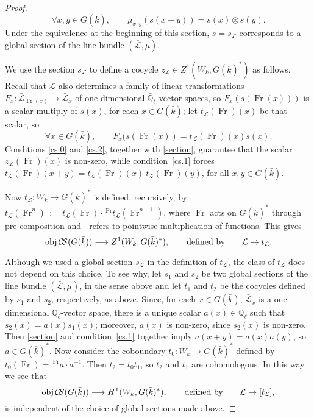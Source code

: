 \documentclass[11pt]{amsart}
\theoremstyle{plain}
\theoremstyle{definition}
\theoremstyle{remark}
\newcommand{\EE}{\mathbb{\bar Q}_\ell}
\newcommand{\bFq}{\bar{k}}
\newcommand{\Fq}{k}
\newcommand{\Frob}{{\operatorname{Fr}}}
\newcommand{\ceq}{{\, :=\, }}
\newcommand{\obj}{{\text{obj}\, }}
\newcommand{\cs}[1]{{\mathcal{#1}}}
\newcommand{\gcs}[1]{{\mathcal{\bar #1}}}
\newcommand{\CS}{{\mathcal{C\hskip-1.8pt S}}}
\newcommand\Clifton[1]{\marginpar{\smaller\smaller CC: #1}}
\begin{document}
\begin{proof}
  \begin{equation}\label{section}
    \forall x,y \in G(\bFq), \qquad \mu_{x,y}(s(x+y)) = s(x)\otimes s(y).
  \end{equation}
  Under the equivalence at the beginning of this section, $s = s_\cs{L}$
  corresponds to a global section of the line bundle $(\gcs{L},\mu)$.

  We use the section $s_\cs{L}$ to define a cocycle $z_\cs{L} \in Z^1(W_\Fq,G(\bFq)^*)$
  as follows. Recall that $\cs{L}$ also determines a family of linear transformations
  $F_x : \gcs{L}_{\Frob(x)} \to \gcs{L}_x$ of one-dimensional $\EE$-vector
  spaces, so $F_x(s(\Frob(x)))$ is a scalar multiply of $s(x)$, for
  each $x\in G(\bFq)$; let $t_\cs{L}(\Frob)(x)$ be that scalar, so
  \begin{equation}\label{t}
    \forall x\in G(\bFq),\qquad F_{x}(s(\Frob(x)) = t_\cs{L}(\Frob)(x) s(x).
  \end{equation}
  Conditions \ref{cs.0} and \ref{cs.2}, together with \eqref{section}, guarantee that
  the scalar $z_\cs{L}(\Frob)(x)$ is non-zero, while condition~\ref{cs.1} forces
  $t_\cs{L}(\Frob)(x+y) = t_\cs{L}(\Frob)(x) \ t_\cs{L}(\Frob)(y)$,
  for all $x,y \in G(\bFq)$.

  Now $t_\cs{L} : W_\Fq \to G(\bFq)^*$ is defined, recursively, by
  $t_\cs{L}(\Frob^n) \ceq t_\cs{L}(\Frob)\cdot \,^\Frob t_\cs{L}(\Frob^{n-1})$,
  where $\Frob$ acts on $G(\bFq)^*$ through pre-composition and $\cdot$ refers
  to pointwise multiplication of functions. This gives
  \[
  \obj \CS(G(\bFq)) \longrightarrow Z^1(W_\Fq,G(\bFq)^*),
  \qquad \text{defined by} \qquad \cs{L} \mapsto t_\cs{L}.
  \]

  Although we used a global section $s_\cs{L}$ in the definition of
  $t_\cs{L}$, the class of $t_\cs{L}$ does not depend on this
  choice. To see why, let $s_1$ and $s_2$ be two global sections of
  the line bundle $(\gcs{L},\mu)$, in the sense above and let $t_1$
  and $t_2$ be the cocycles defined by $s_1$ and $s_2$, respectively,
  as above. Since, for each $x\in G(\bFq)$, $\gcs{L}_x$ is a
  one-dimensional $\EE$-vector space, there is a unique scalar
  $a(x) \in \EE$ such that $s_2(x) = a(x) s_1(x)$; moreover, $a(x)$ is
  non-zero, since $s_2(x)$ is non-zero. Then \eqref{section} and
  condition~\ref{cs.1} together imply $a(x+y) = a(x)a(y)$, so
  $a\in G(\bFq)^*$. Now consider the coboundary $t_0 : W_\Fq \to G(\bFq)^*$
  defined by $t_0(\Frob) = \,^\Frob a \cdot a^{-1}$. Then $t_2 = t_0 t_1$,
  so $t_2$ and $t_1$ are cohomologous. In this way we see that
  \begin{equation}\label{cohomologous}
    \obj \CS(G(\bFq)) \longrightarrow H^1(W_\Fq,G(\bFq)^*),
    \qquad \text{defined by} \qquad \cs{L} \mapsto [t_\cs{L}],
  \end{equation}
  is independent of the choice of global sections made above.


\end{proof}
\end{document}
